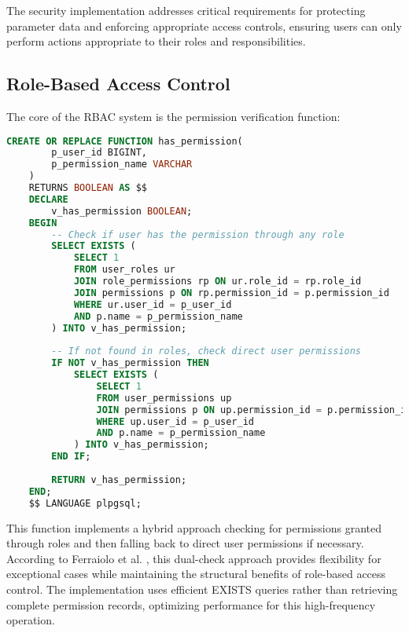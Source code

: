    The security implementation addresses critical requirements for protecting parameter data and enforcing appropriate access controls, ensuring users can only perform actions appropriate to their roles and responsibilities.
    
    \subsection{Role-Based Access Control}
    \label{subsec:role-based-access-control}
    
    The core of the RBAC system is the permission verification function:
    
    \begin{lstlisting}[language=SQL, caption={Permission Verification Function}, label={lst:permission-verification}]
    CREATE OR REPLACE FUNCTION has_permission(
        p_user_id BIGINT,
        p_permission_name VARCHAR
    )
    RETURNS BOOLEAN AS $$
    DECLARE
        v_has_permission BOOLEAN;
    BEGIN
        -- Check if user has the permission through any role
        SELECT EXISTS (
            SELECT 1
            FROM user_roles ur
            JOIN role_permissions rp ON ur.role_id = rp.role_id
            JOIN permissions p ON rp.permission_id = p.permission_id
            WHERE ur.user_id = p_user_id
            AND p.name = p_permission_name
        ) INTO v_has_permission;
        
        -- If not found in roles, check direct user permissions
        IF NOT v_has_permission THEN
            SELECT EXISTS (
                SELECT 1
                FROM user_permissions up
                JOIN permissions p ON up.permission_id = p.permission_id
                WHERE up.user_id = p_user_id
                AND p.name = p_permission_name
            ) INTO v_has_permission;
        END IF;
        
        RETURN v_has_permission;
    END;
    $$ LANGUAGE plpgsql;
    \end{lstlisting}
    
    This function implements a hybrid approach checking for permissions granted through roles and then falling back to direct user permissions if necessary. According to Ferraiolo et al. \cite{ferraiolo2011policy}, this dual-check approach provides flexibility for exceptional cases while maintaining the structural benefits of role-based access control. The implementation uses efficient EXISTS queries rather than retrieving complete permission records, optimizing performance for this high-frequency operation.
    
